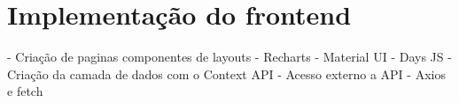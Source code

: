 \section[Implementação do frontend]{Implementação do frontend}
- Criação de paginas componentes de layouts
- Recharts
- Material UI
- Days JS
- Criação da camada de dados com o Context API
- Acesso externo a API
- Axios e fetch